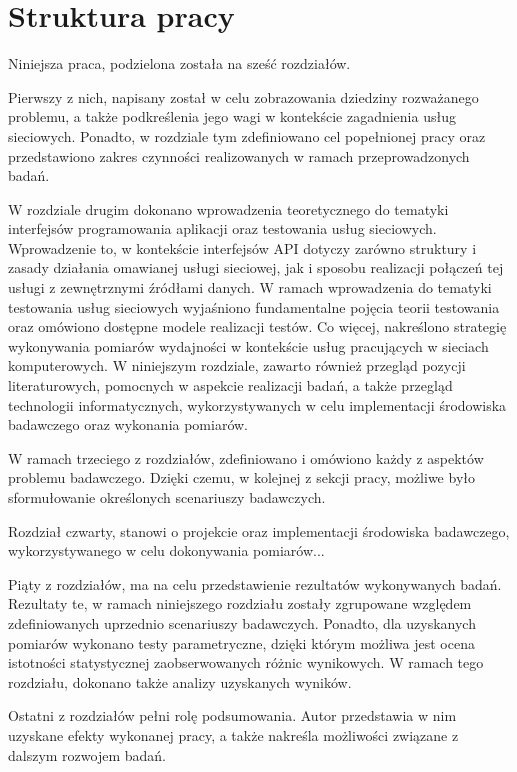 \section{Struktura pracy}
Niniejsza praca, podzielona została na sześć rozdziałów.

Pierwszy z nich, napisany został w celu zobrazowania dziedziny rozważanego problemu, a także podkreślenia jego wagi w kontekście zagadnienia usług sieciowych. Ponadto, w rozdziale tym zdefiniowano cel popełnionej pracy oraz przedstawiono zakres czynności realizowanych w ramach przeprowadzonych badań.

W rozdziale drugim dokonano wprowadzenia teoretycznego do tematyki interfejsów programowania aplikacji oraz testowania usług sieciowych. Wprowadzenie to, w kontekście interfejsów API dotyczy zarówno struktury i zasady działania omawianej usługi sieciowej, jak i sposobu realizacji połączeń tej usługi z zewnętrznymi źródłami danych. W ramach wprowadzenia do tematyki testowania usług sieciowych wyjaśniono fundamentalne pojęcia teorii testowania oraz omówiono dostępne modele realizacji testów. Co więcej, nakreślono strategię wykonywania pomiarów wydajności w kontekście usług pracujących w sieciach komputerowych. W niniejszym rozdziale, zawarto również przegląd pozycji literaturowych, pomocnych w aspekcie realizacji badań, a także przegląd technologii informatycznych, wykorzystywanych w celu implementacji środowiska badawczego oraz wykonania pomiarów.

W ramach trzeciego z rozdziałów, zdefiniowano i omówiono każdy z aspektów problemu badawczego. Dzięki czemu, w kolejnej z sekcji pracy, możliwe było sformułowanie określonych scenariuszy badawczych.

Rozdział czwarty, stanowi o projekcie oraz implementacji środowiska badawczego, wykorzystywanego w celu dokonywania pomiarów...

Piąty z rozdziałów, ma na celu przedstawienie rezultatów wykonywanych badań. Rezultaty te, w ramach niniejszego rozdziału zostały zgrupowane względem zdefiniowanych uprzednio scenariuszy badawczych. Ponadto, dla uzyskanych pomiarów wykonano testy parametryczne, dzięki którym możliwa jest ocena istotności statystycznej zaobserwowanych różnic wynikowych. W ramach tego rozdziału, dokonano także analizy uzyskanych wyników.

Ostatni z rozdziałów pełni rolę podsumowania. Autor przedstawia w nim uzyskane efekty wykonanej pracy, a także nakreśla możliwości związane z dalszym rozwojem badań.